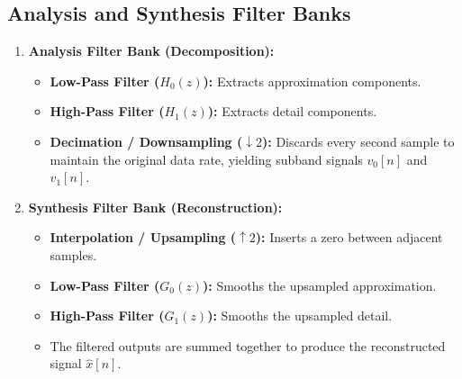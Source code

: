 \documentclass[12pt,a4paper]{article}
\begin{document}
\subsection{Analysis and Synthesis Filter Banks}
\begin{enumerate}[leftmargin=*, itemsep=4pt]
  \item \textbf{Analysis Filter Bank (Decomposition):}
        \begin{itemize}[leftmargin=*, itemsep=2.5pt, topsep=2pt]
          \item \textbf{Low-Pass Filter ($H_0(z)$):} Extracts approximation components.
          \item \textbf{High-Pass Filter ($H_1(z)$):} Extracts detail components.
          \item \textbf{Decimation / Downsampling ($\downarrow 2$):} Discards every second sample to maintain the original data rate, yielding subband signals $v_0[n]$ and $v_1[n]$.
        \end{itemize}
  \item \textbf{Synthesis Filter Bank (Reconstruction):}
        \begin{itemize}[leftmargin=*, itemsep=2.5pt, topsep=2pt]
          \item \textbf{Interpolation / Upsampling ($\uparrow 2$):} Inserts a zero between adjacent samples.
          \item \textbf{Low-Pass Filter ($G_0(z)$):} Smooths the upsampled approximation.
          \item \textbf{High-Pass Filter ($G_1(z)$):} Smooths the upsampled detail.
          \item The filtered outputs are summed together to produce the reconstructed signal $\hat{x}[n]$.
        \end{itemize}
\end{enumerate}
\end{document}
